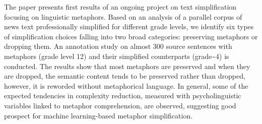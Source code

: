 The paper presents first results of an ongoing project on text simplification focusing on linguistic metaphors. Based on an analysis of a parallel corpus of news text professionally simplified for different grade levels, we identify six types of simplification choices falling into two broad categories: preserving metaphors or dropping them. An annotation study on almost 300 source sentences with metaphors (grade level 12) and their simplified counterparts (grade{\textasciitilde}4) is conducted. The results show that most metaphors are preserved and when they are dropped, the semantic content tends to be preserved rather than dropped, however, it is reworded without metaphorical language. In general, some of the expected tendencies in complexity reduction, measured with psycholinguistic variables linked to metaphor comprehension, are observed, suggesting good prospect for machine learning-based metaphor simplification.
